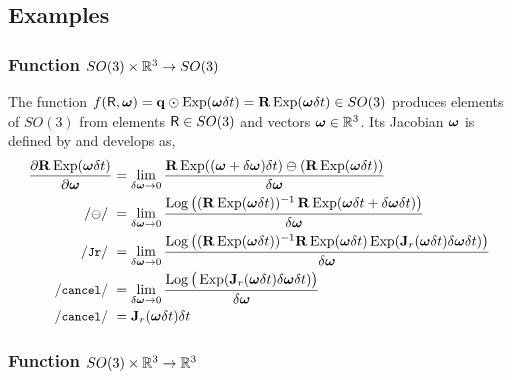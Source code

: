 \subsection{Examples}



\subsubsection{Function $SO(3)\times{\mathbb R}^3\to SO(3)$} 
\label{sec:jac_R3toSO3}

The function $f(\mathsf R,{{\bm \omega}}) = {\bf q}\odot\operatorname*{Exp}({{\bm \omega}}\delta t) = {\bf R}\operatorname*{Exp}({{\bm \omega}}\delta t)\in SO(3)$ produces elements of $SO(3)$ from elements $\mathsf R\in SO(3)$ and vectors ${{\bm \omega}}\in{\mathbb R}^3$. 
Its Jacobian \wrt ${{\bm \omega}}$ is defined by  and develops as,
%
\begin{align*}
\dpar{\bfR\Exp(\bw\dt)}{\bw} 
&= \lim_{\delta\bw\to0}\frac{\bfR\Exp((\bw+\delta\bw)\dt) \ominus (\bfR\Exp(\bw\dt)) }{\delta\bw} \\
\com{$\ominus$}
&= \lim_{\delta\bw\to0}\frac{\Log\big((\bfR\Exp(\bw\dt))\inv \, \bfR\Exp(\bw\dt+\delta\bw\dt)\big)}{\delta\bw} \\
\cJr
&= \lim_{\delta\bw\to0}\frac{\Log\big((\bfR\Exp(\bw\dt))\inv \bfR\Exp(\bw\dt)\Exp(\bfJ_r(\bw\dt)\delta\bw\dt)\big)}{\delta\bw} \\
\ccancel
&= \lim_{\delta\bw\to0}\frac{\Log\big(\Exp(\bfJ_r(\bw\dt)\delta\bw\dt)\big)}{\delta\bw} \\
\com{cancel}
&= \bfJ_r(\bw\dt)\dt
\end{align*}
%


\subsubsection{Function $SO(3)\times{\mathbb R}^3\to{\mathbb R}^3$} 
\label{sec:jac_SO3xR3toR3}

